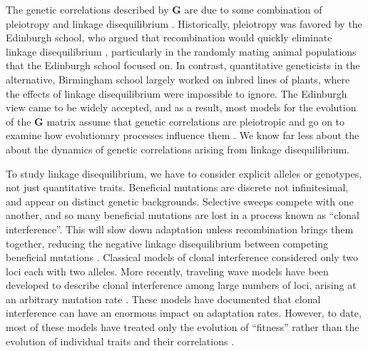 \documentclass[9pt,twocolumn,twoside]{gsajnl}
\newcommand{\G}{\textbf{G }}
\begin{document}
The genetic correlations described by \G are due to some combination of pleiotropy and linkage disequilibrium \cite{Saltz2017}. Historically, pleiotropy was favored by the Edinburgh school, who argued that recombination would quickly eliminate linkage disequilibrium \citep[Chapter~20]{fox2006evolutionary}, particularly in the randomly mating animal populations that the Edinburgh school focused on. In contrast, quantitative geneticists in the alternative, Birmingham school largely worked on inbred lines of plants, where the effects of linkage disequilibrium were impossible to ignore. The Edinburgh view came to be widely accepted, and as a result, most models for the evolution of the \G  matrix assume that genetic correlations are pleiotropic and go on to examine how evolutionary processes influence them \citep{Turelli1988}. We know far less about the about the dynamics of genetic correlations arising from linkage disequilibrium.\par

To study linkage disequilibrium, we have to consider explicit alleles or genotypes, not just quantitative traits. Beneficial mutations are discrete not infinitesimal, and appear on distinct genetic backgrounds. Selective sweeps compete with one another, and so many beneficial mutations are lost in a process known as ``clonal interference''. This will slow down adaptation \citep{hill1966effect} unless recombination brings them together, reducing the negative linkage disequilibrium between competing beneficial mutations \cite{fisher1930genetical,muller1932some}. Classical models of clonal interference considered only two loci each with two alleles. More recently, traveling wave models have been developed to describe clonal interference among large numbers of loci, arising at an arbitrary mutation rate \citep{rouzine2003solitary,desai2007beneficial,park2010speed,good2012distribution,neher2010rate,fisher2013asexual,rouzine2010multi,rouzine2007highly,rouzine2008traveling}. These models have documented that clonal interference can have an enormous impact on adaptation rates. However, to date, most of these models have treated only the evolution of ``fitness'' rather than the evolution of individual traits and their correlations \cite{}. \par

% 
% 
% 
%
% 
% 
% 
% 
\end{document}
